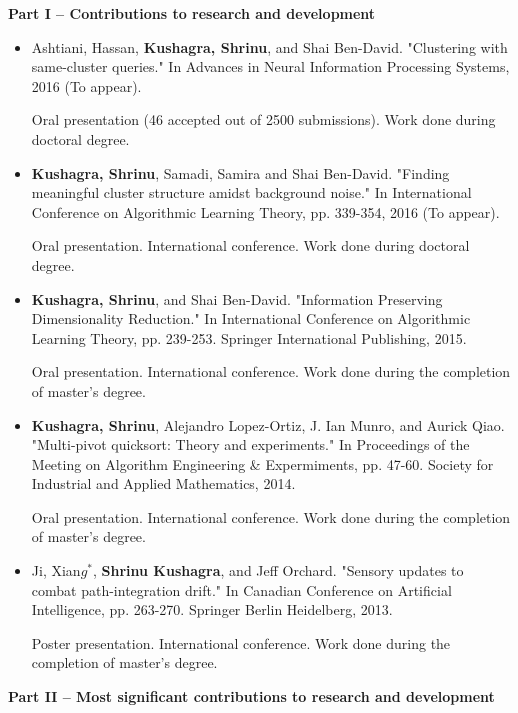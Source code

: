 \documentclass[12pt]{article}
\begin{document}
\linespread{0.901}

\noindent\textbf{Part I – Contributions to research and development}

\begin{itemize}[noitemsep]
\item   Ashtiani, Hassan, \textbf{Kushagra, Shrinu}, and Shai Ben-David. "Clustering with same-cluster queries." In Advances in Neural Information Processing Systems, 2016 (To appear).

Oral presentation (46 accepted out of 2500 submissions). Work done during doctoral degree.

\item  \textbf{Kushagra, Shrinu}, Samadi, Samira and Shai Ben-David. "Finding meaningful cluster structure amidst background noise." In International Conference on Algorithmic Learning Theory, pp. 339-354, 2016 (To appear).

Oral presentation. International conference. Work done during doctoral degree.
 
\item \textbf{Kushagra, Shrinu}, and Shai Ben-David. "Information Preserving Dimensionality Reduction." In International Conference on Algorithmic Learning Theory, pp. 239-253. Springer International Publishing, 2015.

Oral presentation. International conference. Work done during the completion of master's degree.

\item \textbf{Kushagra, Shrinu}, Alejandro Lopez-Ortiz, J. Ian Munro, and Aurick Qiao. "Multi-pivot quicksort: Theory and experiments." In Proceedings of the Meeting on Algorithm Engineering \& Expermiments, pp. 47-60. Society for Industrial and Applied Mathematics, 2014.

Oral presentation. International conference. Work done during the completion of master's degree.

\item Ji, Xian$g^*$, \textbf{Shrinu Kushagra}, and Jeff Orchard. "Sensory updates to combat path-integration drift." In Canadian Conference on Artificial Intelligence, pp. 263-270. Springer Berlin Heidelberg, 2013.

Poster presentation. International conference. Work done during the completion of master's degree.
\end{itemize}

\noindent\textbf{Part II – Most significant contributions to research and development}
\end{document}
